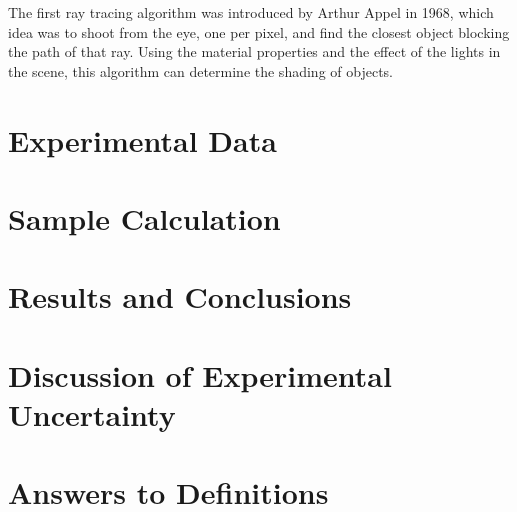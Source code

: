 \documentclass{article}
\begin{document}
\vspace*{\baselineskip}

The first ray tracing algorithm was introduced by Arthur Appel in 1968, which idea was to shoot from the eye, one per pixel, and find the closest object blocking the path of that ray. Using the material properties and the effect of the lights in the scene, this algorithm can determine the shading of objects. \cite{appel} 


\section{Experimental Data}



\section{Sample Calculation}


\section{Results and Conclusions}


\section{Discussion of Experimental Uncertainty}


\section{Answers to Definitions}





\end{document}
